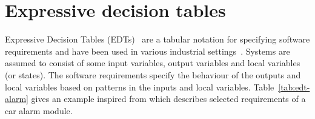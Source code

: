 \label{sec:edt}%

\section{Expressive decision tables}
Expressive Decision Tables (EDTs)~\cite{Venkatesh:DATE:2014} are a
tabular notation for specifying software requirements and have been
used in various industrial settings~\cite{Venkatesh:ENASE:2015}.  Systems are assumed to consist
of some input variables, output variables and local variables (or
states). The software requirements specify the
behaviour of the outputs and local variables based on patterns
in the inputs and local variables. Table~\ref{tab:edt-alarm} gives an example inspired from
\cite{Venkatesh:ENASE:2015} which describes selected requirements of a
car alarm module.

